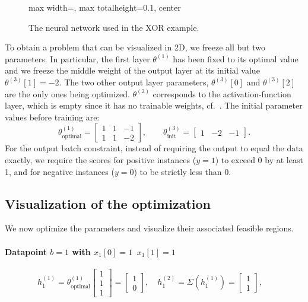 \begin{figure}[ht]
\centering
\begin{adjustbox}{max width=\textwidth, max totalheight=0.1\textheight, center}

\end{adjustbox}
\caption{The neural network used in the XOR example.} \label{fig:xor_network}
\end{figure}

To obtain a problem that can be visualized in 2D, we freeze all but two parameters. In particular, the first layer $\theta^{(1)}$ has been fixed to its optimal value and we freeze the middle weight of the output layer at its initial value $\theta^{(3)}[1] = -2$. The two other output layer parameters, $\theta^{(3)}[0]$ and $\theta^{(3)}[2]$ are the only ones being optimized. $\theta^{(2)}$ corresponds to the activation-function layer, which is empty since it has no trainable weights, cf.\ . The initial parameter values before training are:
\begin{equation*}
  \theta^{(1)}_{\mathrm{optimal}} =
\begin{bmatrix} 1 & 1 & -1 \\ 1 & 1 & -2 \end{bmatrix}, \qquad
\theta^{(3)}_{\mathrm{init}} =
\begin{bmatrix} 1 & -2 & -1 \end{bmatrix}.
\end{equation*}
For the output batch constraint, instead of requiring the output to equal the data exactly, we require the scores for positive instances ($y = 1$) to exceed $0$ by at least 1, and for negative instances ($y = 0$) to be strictly less than $0$. 
\subsection{Visualization of the optimization}
We now optimize the parameters and visualize their associated feasible regions.

\paragraph{Datapoint $b=1$ with $x_1[0]=1$\, $x_1[1]=1$}
\[
    h_1^{(1)} = \theta^{(1)}_{\mathrm{optimal}} \begin{bmatrix} 1 \\ 1 \\ 1 \end{bmatrix} = \begin{bmatrix} 1 \\ 0 \end{bmatrix},\quad
    h_1^{(2)} = \Sigma\left( h_1^{(1)} \right) =  \begin{bmatrix} 1 \\ 1 \end{bmatrix},\quad
\]

